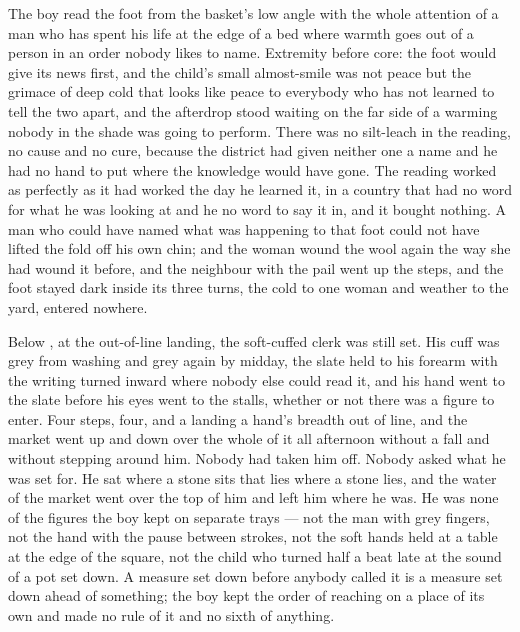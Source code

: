 The boy read the foot from the basket's low angle with the whole attention of a man who has spent his life at the edge of a bed where warmth goes out of a person in an order nobody likes to name. Extremity before core: the foot would give its news first, and the child's small almost-smile was not peace but the grimace of deep cold that looks like peace to everybody who has not learned to tell the two apart, and the afterdrop stood waiting on the far side of a warming nobody in the shade was going to perform. There was no silt-leach in the reading, no cause and no cure, because the district had given neither one a name and he had no hand to put where the knowledge would have gone. The reading worked as perfectly as it had worked the day he learned it, in a country that had no word for what he was looking at and he no word to say it in, and it bought nothing. A man who could have named what was happening to that foot could not have lifted the fold off his own chin; and the woman wound the wool again the way she had wound it before, and the neighbour with the pail went up the steps, and the foot stayed dark inside its three turns, the cold to one woman and weather to the yard, entered nowhere.

\scenebreak

Below , at the out-of-line landing, the soft-cuffed clerk was still set. His cuff was grey from washing and grey again by midday, the slate held to his forearm with the writing turned inward where nobody else could read it, and his hand went to the slate before his eyes went to the stalls, whether or not there was a figure to enter. Four steps, four, and a landing a hand's breadth out of line, and the market went up and down over the whole of it all afternoon without a fall and without stepping around him. Nobody had taken him off. Nobody asked what he was set for. He sat where a stone sits that lies where a stone lies, and the water of the market went over the top of him and left him where he was. He was none of the figures the boy kept on separate trays --- not the man with grey fingers, not the hand with the pause between strokes, not the soft hands held at a table at the edge of the square, not the child who turned half a beat late at the sound of a pot set down. A measure set down before anybody called it is a measure set down ahead of something; the boy kept the order of reaching on a place of its own and made no rule of it and no sixth of anything.

\scenebreak

